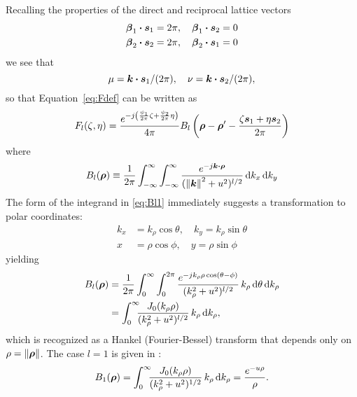  Recalling the properties of the direct and reciprocal lattice vectors
 \begin{subequations}
   \begin{align}
     \boldsymbol{\beta}_1\boldsymbol{\cdot}\boldsymbol{s}_1 &= 2\pi, \quad \boldsymbol{\beta}_1\boldsymbol{\cdot}\boldsymbol{s}_2 = 0 \\
     \boldsymbol{\beta}_2\boldsymbol{\cdot}\boldsymbol{s}_2 &= 2\pi, \quad \boldsymbol{\beta}_2\boldsymbol{\cdot}\boldsymbol{s}_1 = 0
   \end{align}
 \end{subequations}
 we see that 
 \begin{equation}
   \mu = \boldsymbol{k} \boldsymbol{\cdot} \boldsymbol{s}_1 /(2\pi), \quad \nu = \boldsymbol{k} \boldsymbol{\cdot} \boldsymbol{s}_2/(2\pi),
   \nonumber
 \end{equation}
so that Equation~\eqref{eq:Fdef} can be written as
 \begin{equation}
   F_l(\zeta,\eta)  =  
   \frac{
     e^{-j\left(\frac{\psi_1}{2\pi}\zeta+\frac{\psi_2}{2\pi}\eta\right)}}
   {4\pi}
   B_l\left(\boldsymbol{\rho}-\boldsymbol{\rho}'-\frac{\zeta\boldsymbol{s}_1 + \eta\boldsymbol{s}_2}{2\pi}\right)
   \end{equation}
where
 \begin{equation}
   B_l(\boldsymbol{\rho})  \equiv  \frac{1}{2\pi}
   \int_{-\infty}^{\infty}\int_{-\infty}^{\infty}
   \frac{e^{-j\boldsymbol{k} \boldsymbol{\cdot} \boldsymbol{\rho}}}{(\left\lVert\boldsymbol{k}\right\rVert^2 +u^2)^{l/2}} 
     \, \text{d} k_x\,\text{d} k_y 
     \label{eq:Bl1}
   \end{equation}
The form of the integrand in \eqref{eq:Bl1}
immediately suggests a transformation to polar coordinates:
\begin{align*}
  k_x &= k_{\rho} \cos\theta,  \quad k_y =  k_{\rho} \sin\theta \\
  x &= \rho \cos\phi,  \quad y = \rho \sin\phi
\end{align*}
yielding
\begin{align}
  B_l(\boldsymbol{\rho}) 
  & = 
  \frac{1}{2\pi} \int_0^\infty \int_0^{2\pi}
  \frac{e^{-j k_{\rho} {\rho} \cos(\theta-{\phi})}}
  {(k_{\rho}^2 + u^2)^{l/2}}
  \, k_{\rho} \, \text{d} \theta \, \text{d} k_{\rho}  \nonumber \\
  &=
  \int_0^{\infty} \!\!\!
  \frac{J_0(k_{\rho} {\rho})}
  {(k_{\rho}^2 + u^2)^{l/2}}
  \, k_{\rho} \, \text{d} k_{\rho},
\end{align}
which is recognized as a Hankel (Fourier-Bessel) transform that
depends only on $\rho = \left\lVert\boldsymbol{\rho}\right\rVert$.
The case $l=1$ is given in \cite[Eqn.~(5.15.5)]{lebe:72}:
\begin{equation}
  B_1(\boldsymbol{\rho}) 
  =  
   \int_0^{\infty} \!\!\!
  \frac{J_0(k_{\rho} {\rho})}
  {(k_{\rho}^2 + u^2)^{1/2}}
  \, k_{\rho} \, \text{d} k_{\rho} 
  = \frac{e^{-u{\rho}}}{{\rho}}.
\end{equation}
